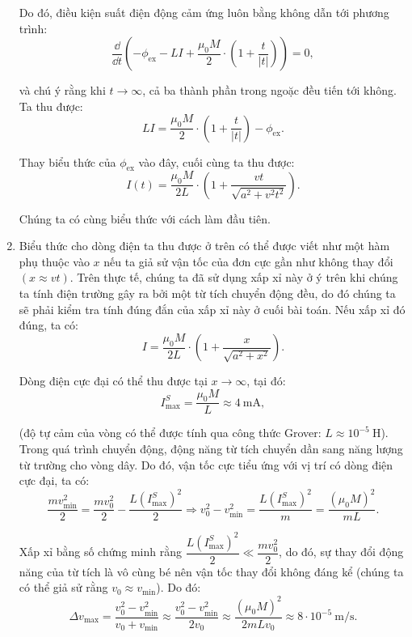 \begin{loigiai}
\begin{enumerate}[1)]
Do đó, điều kiện suất điện động cảm ứng luôn bằng không dẫn tới phương trình:
   \[\dfrac{\dd}{\dd t} \left( - \phi_{\text{ex}} -LI + \dfrac{\mu_0 M}{2} \cdot \left( 1 + \dfrac{t}{|t|} \right) \right) =0, \]

và chú ý rằng khi $t \rightarrow \infty$, cả ba thành phần trong ngoặc đều tiến tới không. Ta thu được:
   \[ LI = \dfrac{\mu_0 M}{2} \cdot\left( 1+ \dfrac{t}{|t|} \right) - \phi_{\text{ex}}.\]

Thay biểu thức của $\phi_{\text{ex}}$ vào đây, cuối cùng ta thu được:
    \[I(t) =\dfrac{\mu_0 M}{2L} \cdot \left(1 + \dfrac{vt}{\sqrt{a^2 + v^2 t^2}} \right).\]

Chúng ta có cùng biểu thức với cách làm đầu tiên.
\item Biểu thức cho dòng điện ta thu được ở trên có thể được viết như một hàm phụ thuộc vào $x$ nếu ta giả sử vận tốc của đơn cực gần như không thay đổi $(x \approx vt)$. Trên thực tế, chúng ta đã sử dụng xấp xỉ này ở ý trên khi chúng ta tính điện trường gây ra bởi một từ tích chuyển động đều, do đó chúng ta sẽ phải kiểm tra tính đúng đắn của xấp xỉ này ở cuối bài toán. Nếu xấp xỉ đó đúng, ta có:
  \[ I = \dfrac{\mu_0 M}{2L} \cdot \left( 1 + \dfrac{x}{\sqrt{a^2 + x^2}}\right).\]

Dòng điện cực đại có thể thu được tại $x \rightarrow \infty$, tại đó:
   \[I_{\max}^{S} = \dfrac{\mu_0 M}{L} \approx 4 ~\mathrm{mA},\]

(độ tự cảm của vòng có thể được tính qua công thức Grover: $L \approx 10^{-5} ~\mathrm{H}$).\\
Trong quá trình chuyển động, động năng từ tích chuyển dần sang năng lượng từ trường cho vòng dây. Do đó, vận tốc cực tiểu ứng với vị trí có dòng điện cực đại, ta có:
  \[\dfrac{m v_{\min}^2}{2} = \dfrac{mv_0^2}{2} - \dfrac{L(I_{\max}^{S} )^2}{2} \Rightarrow v_0^2 - v_{\min}^2 =\dfrac{L(I_{\max}^{S} )^2}{m} = \dfrac{(\mu_0M)^2}{mL}.\]
  
Xấp xỉ bằng số chứng minh rằng $\dfrac{L(I_{\max}^{S})^2}{2} \ll \dfrac{mv_0^2}{2}$, do đó, sự thay đổi động năng của từ tích là vô cùng bé nên vận tốc thay đổi không đáng kể (chúng ta có thể giả sử rằng $v_0 \approx v_{\min}$). Do đó:
  \[\Delta v_{\max} = \dfrac{v_0^2 - v_{\min}^2}{v_0 + v_{\min}} \approx \dfrac{v_0^2-v_{\min}^2}{2v_0} \approx \dfrac{(\mu_0 M)^2}{2mLv_0} \approx 8 \cdot 10^{-5} ~\mathrm{m/s}.\]


\end{enumerate}
\end{loigiai}
